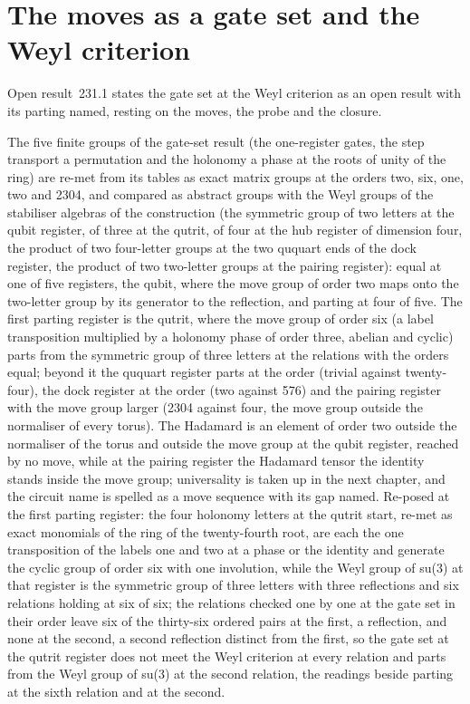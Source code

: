 \section{The moves as a gate set and the Weyl criterion}\label{mod:XIII-2-moves-as-a-gate-set-and-the-weyl-criterion}
\label{narr:open:13-2}Open result~231.1 states the gate set at the Weyl criterion as an open result with its parting named, resting on the moves, the probe and the closure.
\begin{chwall}\label{box:XIII-2-moves-as-a-gate-set-and-the-weyl-criterion:1}
The five finite groups of the gate-set result (the one-register gates, the step transport a permutation and the holonomy a phase at the roots of unity of the ring) are re-met from its tables as exact matrix groups at the orders two, six, one, two and 2304, and compared as abstract groups with the Weyl groups of the stabiliser algebras of the construction (the symmetric group of two letters at the qubit register, of three at the qutrit, of four at the hub register of dimension four, the product of two four-letter groups at the two ququart ends of the dock register, the product of two two-letter groups at the pairing register): equal at one of five registers, the qubit, where the move group of order two maps onto the two-letter group by its generator to the reflection, and parting at four of five. The first parting register is the qutrit, where the move group of order six (a label transposition multiplied by a holonomy phase of order three, abelian and cyclic) parts from the symmetric group of three letters at the relations with the orders equal; beyond it the ququart register parts at the order (trivial against twenty-four), the dock register at the order (two against 576) and the pairing register with the move group larger (2304 against four, the move group outside the normaliser of every torus). The Hadamard is an element of order two outside the normaliser of the torus and outside the move group at the qubit register, reached by no move, while at the pairing register the Hadamard tensor the identity stands inside the move group; universality is taken up in the next chapter, and the circuit name is spelled as a move sequence with its gap named.
Re-posed at the first parting register: the four holonomy letters at the qutrit start, re-met as exact monomials of the ring of the twenty-fourth root, are each the one transposition of the labels one and two at a phase or the identity and generate the cyclic group of order six with one involution, while the Weyl group of su(3) at that register is the symmetric group of three letters with three reflections and six relations holding at six of six; the relations checked one by one at the gate set in their order leave six of the thirty-six ordered pairs at the first, a reflection, and none at the second, a second reflection distinct from the first, so the gate set at the qutrit register does not meet the Weyl criterion at every relation and parts from the Weyl group of su(3) at the second relation, the readings beside parting at the sixth relation and at the second.
\end{chwall}
